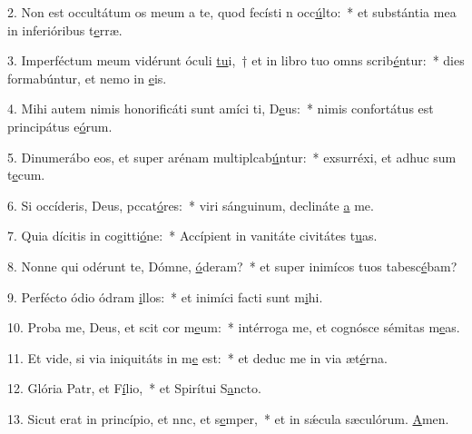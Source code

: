 2. Non est occultátum os meum a te, quod fecísti n occ\uline{ú}lto:~* et substántia mea in inferióribus t\uline{e}rræ.\par 
3. Imperféctum meum vidérunt óculi \uline{tu}i,~† et in libro tuo omns scrib\uline{é}ntur:~* dies formabúntur, et nemo in \uline{e}is.\par 
4. Mihi autem nimis honorificáti sunt amíci ti, D\uline{e}us:~* nimis confortátus est principátus e\uline{ó}rum.\par 
5. Dinumerábo eos, et super arénam multiplcab\uline{ú}ntur:~* exsurréxi, et adhuc sum t\uline{e}cum.\par 
6. Si occíderis, Deus, pccat\uline{ó}res:~* viri sánguinum, declináte \uline{a} me.\par 
7. Quia dícitis in cogitti\uline{ó}ne:~* Accípient in vanitáte civitátes t\uline{u}as.\par 
8. Nonne qui odérunt te, Dómne, \uline{ó}deram?~* et super inimícos tuos tabesc\uline{é}bam?\par 
9. Perfécto ódio ódram \uline{i}llos:~* et inimíci facti sunt m\uline{i}hi.\par 
10. Proba me, Deus, et scit cor m\uline{e}um:~* intérroga me, et cognósce sémitas m\uline{e}as.\par 
11. Et vide, si via iniquitáts in m\uline{e} est:~* et deduc me in via æt\uline{é}rna.\par 
12. Glória Patr, et F\uline{í}lio,~* et Spirítui S\uline{a}ncto.\par 
13. Sicut erat in princípio, et nnc, et s\uline{e}mper,~* et in sǽcula sæculórum. \uline{A}men.\par 
